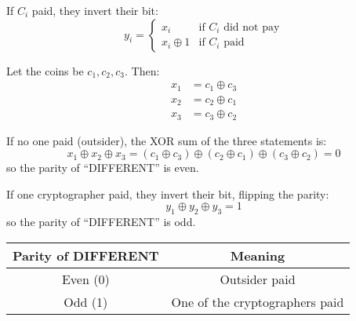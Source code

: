 \begin{enumerate}
{If $C_i$ paid, they invert their bit:
\[
y_i = 
\begin{cases}
x_i & \text{if } C_i \text{ did not pay} \\
x_i \oplus 1 & \text{if } C_i \text{ paid}
\end{cases}
\]

Let the coins be $c_1, c_2, c_3$. Then:
\[
\begin{aligned}
x_1 &= c_1 \oplus c_3 \\
x_2 &= c_2 \oplus c_1 \\
x_3 &= c_3 \oplus c_2
\end{aligned}
\]

If no one paid (outsider), the XOR sum of the three statements is:
\[
x_1 \oplus x_2 \oplus x_3 = (c_1 \oplus c_3) \oplus (c_2 \oplus c_1) \oplus (c_3 \oplus c_2) = 0
\]
so the parity of ``DIFFERENT'' is even.

If one cryptographer paid, they invert their bit, flipping the parity:
\[
y_1 \oplus y_2 \oplus y_3 = 1
\]
so the parity of ``DIFFERENT'' is odd.

\begin{center}
\begin{tabular}{c|c}
Parity of DIFFERENT & Meaning \\
\hline
Even (0) & Outsider paid \\
Odd (1) & One of the cryptographers paid
\end{tabular}
\end{center}

}
\end{enumerate}



